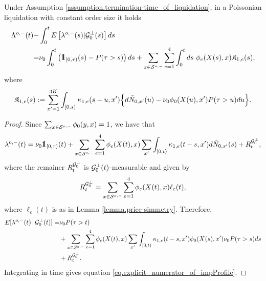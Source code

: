 \documentclass[10pt, article,table]{article}
\begin{document}
\begin{prop}\label{prop.impact_poisson_and_constant-size}
 Under Assumption \ref{assumption.termination-time_of_liquidation}, in a Poissonian liquidation with constant order size 
 it holds
 \begin{equation}\label{eq.explicit_numerator_of_impProfile}
 \begin{split}
  \weakDeflCompensator(t) 
    -& \intzerot\Expectation\left[\weakDeflIntensity(s)\vert \liquidatorSigmaAlgebra\orthogonal(s)\right]ds
\\
=&
\baseRate_{0}\intzerot \left(\one_{[0,\terminationTime)} (s) - \Prob(\terminationTime>s)\right)ds
+
\sum_{x\in\weakDeflSpace} \sum_{e=1}^{4}
\intzerot ds \, \, \transProb_{e}(\stateVariable(s),x)\Kappa_{1,e}(s),
\end{split}
 \end{equation}
 where 
 \begin{equation*}
  \mathfrak{K}_{1,e}(s) :=
\sum_{x^{\prime}=1}^{3K}\int_{[0,s)}\kappa_{1,e}(s-u, x^{\prime})
\Big\lbrace
d\tilde{N}_{0,x^{\prime}}(u)
- \nu_{0}\phi_{0}(X(u),x^{\prime}){{P}}(\tau>u) du
\Big\rbrace.
 \end{equation*}
\end{prop}
\begin{proof}
 Since $\sum_{x\in\mathcal{S}^{o,-}}\phi_{0}(y,x) = 1$, we have that 
 \begin{equation*}
  \weakDeflIntensity(t)
  =
  \baseRate_{0} \one_{[0,\terminationTime)} (t)
  + \sum_{x\in\weakDeflSpace} \sum_{e=1}^{4}
  \transProb_e(\stateVariable(t),x)\sum_{\xone} \int_{[0,t)} \hawkesKernel_{1,e}(t-s, \xone) d\hybridHawkes_{0,\xone}(s)
  + R_{t}^{\sigmaAlgebraG_{0}\orthogonal},
 \end{equation*}
where the remainer $R_{t}^{\mathcal{G}_{0}^{\perp}}$ is $\mathcal{G}_{0}^{\perp}(t)$-measurable and given by
\begin{equation*}
 R_{t}^{\mathcal{G}_{0}^{\perp}}
 =
 \sum_{x\in\mathcal{S}^{o,-}}\sum_{e=1}^{4}
 \phi_{e}(X(t),x) \ell_{e}(t),
\end{equation*}
where $\ell_e(t)$ is as in Lemma \ref{lemma.price-simmetry}. Therefore, 
\begin{equation*}
 \begin{split}
  {{E}}[\lambda_{}^{o,-}(t)\,\vert\, \mathcal{G}_{0}^{\perp}(t) ]
  =& 
  \nu_{0} {{P}}(\tau > t)
  \\
  &+
  \sum_{x\in\mathcal{S}^{o,-}} \sum_{e=1}^{4}
  \phi_e(X(t),x)\sum_{x^{\prime}} \int_{[0,t)} \kappa_{1,e}(t-s, x^{\prime}) \phi_{0}(X(s),x^{\prime}) \nu_{0}{{P}}(\tau>s) ds
  \\
  &+ R^{\mathcal{G}_{0}^{\perp}}_{t}.
 \end{split}
\end{equation*}
Integrating in time gives equation \eqref{eq.explicit_numerator_of_impProfile}.
\end{proof}
\end{document}
